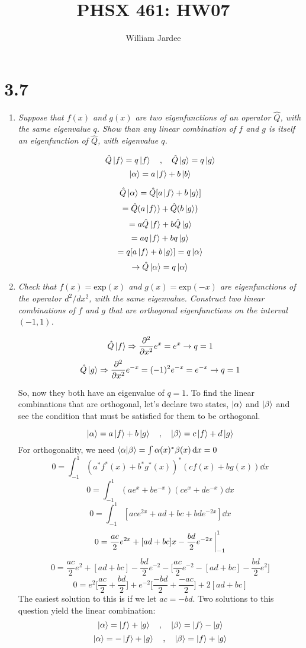 \documentclass[12pt]{article}
\begin{document}
\title{PHSX 461: HW07}
\author{William Jardee}
\maketitle

\section*{3.7}
\begin{enumerate}[label=\alph*)]
\item \emph{Suppose that $f(x)$ and $g(x)$ are two eigenfunctions of an operator $\hat{Q}$, with the same eigenvalue $q$. Show than any linear combination of $f$ and $g$ is itself an eigenfunction of $\hat{Q}$, with eigenvalue $q$.}\bigskip

\[\hat{Q}\ket{f} = q\ket{f} \quad , \quad \hat{Q}\ket{g} = q \ket{g}\]
\[\ket{\alpha} = a\ket{f} + b\ket{b}\]

\[\hat{Q}\ket{\alpha} = \hat{Q}[a\ket{f} + b\ket{g}]\]
\[=\hat{Q}(a\ket{f}) + \hat{Q}(b\ket{g})\]
\[=a\hat{Q}\ket{f} + b\hat{Q}\ket{g}\]
\[=aq\ket{f} + bq\ket{g}\]
\[=q[a\ket{f} + b\ket{g}] = q\ket{\alpha}\]
\[\rightarrow \hat{Q}\ket{\alpha} = q\ket{\alpha}\]

\item \emph{Check that $f(x) = \text{exp} (x)$ and $g(x) = \text{exp} (-x)$ are eigenfunctions of the operator $d^2/dx^2$, with the same eigenvalue. Construct two linear combinations of $f$ and $g$ that are orthogonal eigenfunctions on the interval $(-1,1)$.}

\[\hat{Q}\ket{f} \Rightarrow \pdv[2]{x}e^x =e^x \rightarrow q=1\]
\[\hat{Q}\ket{g} \Rightarrow \pdv[2]{x}e^{-x} =(-1)^2e^{-x}=e^{-x} \rightarrow q=1\]

So, now they both have an eigenvalue of $q=1$. To find the linear combinations that are orthogonal, let's declare two states, $\ket{\alpha}$ and $\ket{\beta}$ and see the condition that must be satisfied for them to be orthogonal.

\[\ket{\alpha} = a\ket{f} + b\ket{g} \quad , \quad \ket{\beta} = c\ket{f} + d\ket{g}\]
For orthogonality, we need $\braket{\alpha}{\beta} = \int \alpha(x)^* \beta(x) \dd{x} = 0$
\[0=\int^1_{-1} (a^* f^*(x) + b^* g^*(x))^* (cf(x) + bg(x)) \dd{x}\]
\[0=\int^1_{-1} (ae^x + be^{-x})(ce^x + de^{-x})\dd{x}\]
\[0=\int^1_{-1} [ace^{2x} + ad+bc + bde^{-2x}] \dd{x}\]
\[0= \frac{ac}{2}e^{2x} + [ad+bc]x -\frac{bd}{2}e^{-2x}\eval^1_{-1}\] 
\[0=\frac{ac}{2}e^2 + [ad+bc] -\frac{bd}{2}e^{-2} -\Big[\frac{ac}{2}e^{-2} -[ad+bc] -\frac{bd}{2}e^2\Big]\]
\[0=e^2\Big[\frac{ac}{2}+\frac{bd}{2}\Big] + e^{-2}\Big[\frac{-bd}{2} + \frac{-ac}{2}\Big] + 2[ad+bc]\]
The easiest solution to this is if we let $ac = -bd$. Two solutions to this question yield the linear combination:
\[\ket{\alpha} = \ket{f} + \ket{g} \quad , \quad \ket{\beta} = \ket{f} -\ket{g}\]
\[\ket{\alpha} = -\ket{f} + \ket{g} \quad , \quad \ket{\beta} = \ket{f} +\ket{g}\]

\end{enumerate}
\end{document}
